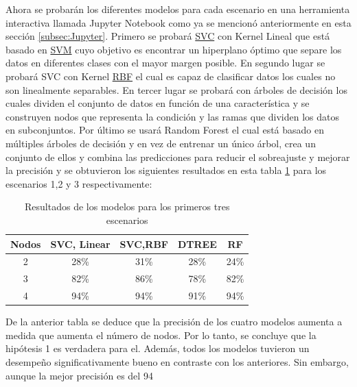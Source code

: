 Ahora se probarán los diferentes modelos para cada escenario en una herramienta interactiva llamada Jupyter Notebook como ya se mencionó anteriormente en esta sección \ref{subsec:Jupyter}. Primero se probará \hyperlink{SVC}{SVC} con Kernel Lineal que está basado en \hyperlink{SVM}{SVM} cuyo objetivo es encontrar un hiperplano óptimo que separe los datos en diferentes clases con el mayor margen posible. En segundo lugar se probará SVC con Kernel \hyperlink{RBF}{RBF} el cual es capaz de clasificar datos los cuales no son linealmente separables. En tercer lugar se probará con árboles de decisión los cuales dividen el conjunto de datos en función de una característica y se construyen nodos que representa la condición y las ramas que dividen los datos en subconjuntos. Por último se usará Random Forest el cual está basado en múltiples árboles de decisión y en vez de entrenar un único árbol, crea un conjunto de ellos y combina las predicciones para reducir el sobreajuste y mejorar la precisión y se obtuvieron los siguientes resultados en esta tabla \ref{cuadro:tabla2} para los escenarios 1,2 y 3 respectivamente:


\begin{table}[H]
\begin{center}
\begin{tabular}{|c|c|c|c|c|}
\hline
\textbf{Nodos} & \textbf{SVC, Linear} & \textbf{SVC,RBF} & \textbf{DTREE} & \textbf{RF} \\
\hline
2 & 28\% & 31\% & 28\% & 24\% \\  
3 & 82\% & 86\% & 78\% & 82\% \\   
4 & 94\% & 94\% & 91\% & 94\% \\   
\hline
\end{tabular}
\caption{Resultados de los modelos para los primeros tres escenarios}
\label{cuadro:tabla2}
\end{center}
\end{table}


De la anterior tabla se deduce que la precisión de los cuatro modelos aumenta a medida que aumenta el número de nodos. Por lo tanto, se concluye que la hipótesis 1 es verdadera para el. Además, todos los modelos tuvieron un desempeño significativamente bueno en contraste con los anteriores. Sin embargo, aunque la mejor precisión es del 94%

